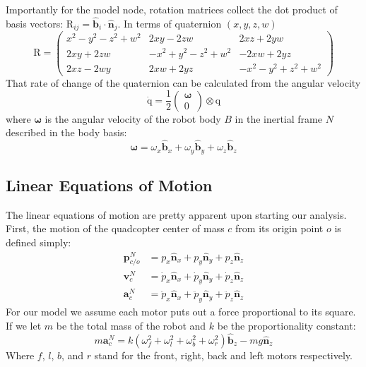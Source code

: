 \documentclass[lettersize,journal]{IEEEtran}
\begin{document}
Importantly for the model node, rotation matrices collect the dot product of basis vectors: $\mathrm{R}_{ij} = \mathbf{\hat{b}}_i \cdot \mathbf{\hat{n}}_j$. In terms of quaternion $(x, y, z, w)$
\begin{equation}
	\mathrm{R}=\left(
	\begin{smallmatrix}
		x^2-y^2-z^2+w^2 & 2xy-2zw & 2xz+2yw \\
    2xy+2zw & -x^2+y^2-z^2+w^2 & -2xw+2yz \\
    2xz-2wy & 2xw+2yz & -x^2-y^2+z^2+w^2
	\end{smallmatrix} 
	\right) \label{EQN:RotationMatrix}
\end{equation}
That rate of change of the quaternion can be calculated from the angular velocity
\begin{equation}
	\mathrm{\dot{q}} = \frac{1}{2}
	\begin{pmatrix}
	  \boldsymbol\omega \\
		0
	\end{pmatrix}
	\otimes \mathrm{q}
\end{equation}
where $\boldsymbol\omega$ is the angular velocity of the robot body $B$ in the inertial frame $N$ described in the body basis:
\begin{equation}
	\boldsymbol\omega = \omega_x \mathbf{\hat{b}}_x + \omega_y \mathbf{\hat{b}}_y + \omega_z \mathbf{\hat{b}}_z \label{EQN:AngularVelocity}
\end{equation}
\subsection{Linear Equations of Motion}
The linear equations of motion are pretty apparent upon starting our analysis. First, the motion of the quadcopter center of mass $c$ from its origin point $o$ is defined simply:
\begin{align}
  \mathbf{p}^N_{c/o} &= p_x \mathbf{\hat{n}}_x + p_y \mathbf{\hat{n}}_y + p_z \mathbf{\hat{n}}_z \\
  \mathbf{v}^N_c &= \dot{p}_x \mathbf{\hat{n}}_x + \dot{p}_y \mathbf{\hat{n}}_y + \dot{p}_z \mathbf{\hat{n}}_z \\
  \mathbf{a}^N_c &= \ddot{p}_x \mathbf{\hat{n}}_x + \ddot{p}_y \mathbf{\hat{n}}_y + \ddot{p}_z \mathbf{\hat{n}}_z
\end{align}
For our model we assume each motor puts out a force proportional to its square.
If we let $m$ be the total mass of the robot and $k$ be the proportionality constant:
\begin{equation}
  m\mathbf{a}^N_c = k \left(\omega_f^2 + \omega_l^2 + \omega_b^2 + \omega_r^2\right) \mathbf{\hat{b}}_z - mg \mathbf{\hat{n}}_z \label{EQN:LinearEOM}
\end{equation}
Where $f$, $l$, $b$, and $r$ stand for the front, right, back and left motors respectively. 
\end{document}

